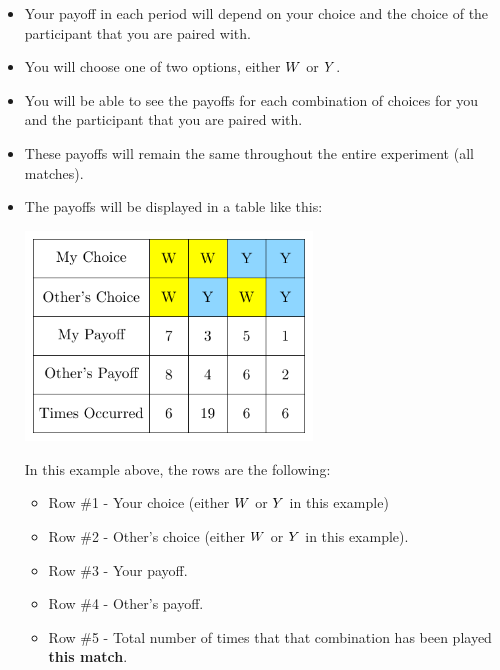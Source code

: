 \documentclass[11pt]{article}
\newcommand{\dblbkt}[1]{}
\begin{document}
\begin{itemize} 
\item Your payoff in each period will depend on your choice and the choice of the participant that you are paired with. 
\item You will choose one of two options, either $W$ or $Y$.
\item You will be able to see the payoffs for each combination of choices for you and the participant that you are paired with. 
\item These payoffs will remain the same throughout the entire experiment (all matches).
\item \dblbkt{2} The payoffs will be displayed in a table like this:


\begin{center} 
	\includegraphics[width=3in]{pictures/gameTable_Reverse.pdf} 
\end{center} 

In this example above, the rows are the following:
\begin{itemize} 
\item \dblbkt{1} Row \#1 - Your choice (either $W$ or $Y$ in this example)
\item \dblbkt{1} Row \#2 - Other's choice (either $W$ or $Y$ in this example).
\item \dblbkt{1} Row \#3 - Your payoff.
\item \dblbkt{1} Row \#4 - Other's payoff.
\item \dblbkt{1} Row \#5 - Total number of times that that combination has been played {\bf this match}.
\end{itemize} 


\end{itemize}
\end{document}
